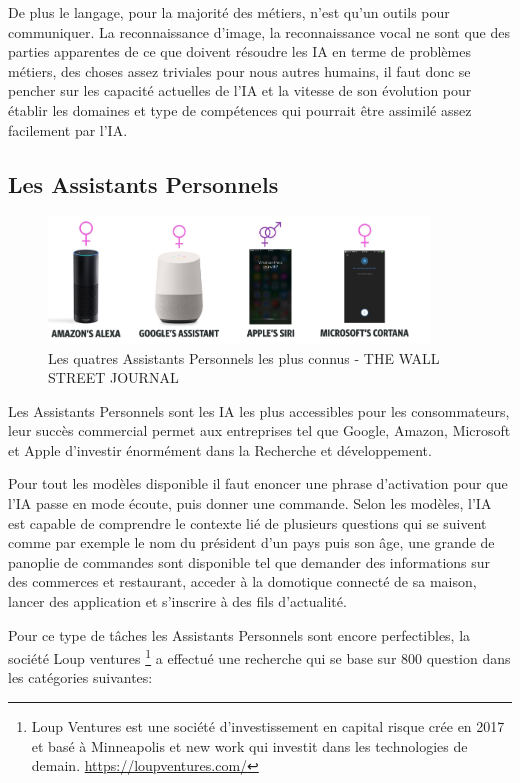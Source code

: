 De plus le langage, pour la majorité des métiers, n'est qu'un outils pour communiquer. La reconnaissance
d'image, la reconnaissance vocal ne sont que des parties apparentes de ce que doivent résoudre les IA
en terme de problèmes métiers, des choses assez triviales pour nous autres humains, il faut donc se pencher
sur les capacité actuelles de l'IA et la vitesse de son évolution pour établir les domaines
et type de compétences qui pourrait être assimilé assez facilement par l'IA. \newline

\subsection*{Les Assistants Personnels}
\begin{figure}[h]
    \centering
    \includegraphics[width=0.9\textwidth]{Images/virtualassistant}
    \caption{Les quatres Assistants Personnels les plus connus - THE WALL STREET JOURNAL}
    \label{fig:mostknownvirtualassistant}
\end{figure}

Les Assistants Personnels sont les IA les plus accessibles pour les consommateurs, leur succès commercial
permet aux entreprises tel que Google, Amazon, Microsoft et Apple d'investir énormément
dans la Recherche et développement.

Pour tout les modèles disponible il faut enoncer une phrase d'activation pour que
l'IA passe en mode écoute, puis donner une commande. Selon les modèles, l'IA
est capable de comprendre le contexte lié de plusieurs questions qui se suivent
comme par exemple le nom du président d'un pays puis son âge, une grande de panoplie de
commandes sont disponible tel que demander des informations sur des commerces et restaurant,
acceder à la domotique connecté de sa maison, lancer des application et s'inscrire à des fils
d'actualité.

Pour ce type de tâches les Assistants Personnels sont encore perfectibles,
la société Loup ventures
\footnote{ Loup Ventures est une société d'investissement en capital risque crée en 2017 et
basé à Minneapolis et new work qui investit dans les technologies de demain. \newline
\url{https://loupventures.com/} }
a effectué une recherche qui se base sur 800 question dans les
catégories suivantes: \newline

